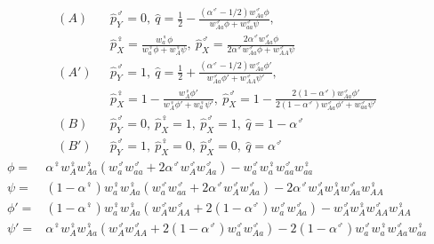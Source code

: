 \documentclass[12pt]{article}
\begin{document}
\begin{subequations}\label{eq:tightequil}
\begin{align}
(A)\ \ \ &\hat{p}_{Y}^{\male}=0,
\ \hat{q}=\frac{1}{2}-\frac{(\alpha^{\male}-1/2)w_{Aa}^{\male} \phi}{w_{Aa}^{\male} \phi+ w_{aa}^{\male} \psi},\\
&\hat{p}_{X}^{\female}=\frac{w_{a}^{\female} \phi}{w_{a}^{\female} \phi+ w_{A}^{\female} \psi},
\ \hat{p}_{X}^{\male}=\frac{2 \alpha^{\male}w_{Aa}^{\male} \phi}{2\alpha^{\male}w_{Aa}^{\male} \phi +w_{AA}^{\male} \psi} \nonumber \\
(A')\ \ \ &\hat{p}_{Y}^{\male}=1,
\ \hat{q}=\frac{1}{2}+\frac{(\alpha^{\male}-1/2)w_{Aa}^{\male} \phi'}{w_{Aa}^{\male} \phi' + w_{AA}^{\male} \psi'},\\
&\hat{p}_{X}^{\female}=1-\frac{w_{A}^{\female} \phi'}{w_{A}^{\female} \phi'+ w_{a}^{\female} \psi'},
\ \hat{p}_{X}^{\male}=1-\frac{2(1-\alpha^{\male})w_{Aa}^{\male} \phi'}{2(1-\alpha^{\male})w_{Aa}^{\male} \phi'+w_{aa}^{\male} \psi'} \nonumber \\
(B)\ \ \ &\hat{p}_{Y}^{\male}=0,\ \hat{p}_{X}^{\female}=1,\ \hat{p}_{X}^{\male}=1, \ \hat{q}=1-\alpha^{\male}\\
(B')\ \ \ &\hat{p}_{Y}^{\male}=1,\ \hat{p}_{X}^{\female}=0,\ \hat{p}_{X}^{\male}=0, \ \hat{q}=\alpha^{\male}
\end{align}
\end{subequations}
\begin{equation*}
\begin{split}
\phi=&\alpha^{\female} w_{A}^{\female} w_{Aa}^{\female}(w_{a}^{\male} w_{aa}^{\male} + 2 \alpha^{\male} w_{A}^{\male} w_{Aa}^{\male}) - w_{a}^{\male} w_{a}^{\female} w_{aa}^{\male} w_{aa}^{\female} \\
\psi=&(1-\alpha^{\female}) w_{a}^{\female} w_{Aa}^{\female}(w_{a}^{\male} w_{aa}^{\male} + 2 \alpha^{\male} w_{A}^{\male} w_{Aa}^{\male}) - 2\alpha^{\male} w_{A}^{\male} w_{A}^{\female} w_{Aa}^{\male} w_{AA}^{\female}\\
\phi'=&(1-\alpha^{\female}) w_{a}^{\female} w_{Aa}^{\female}(w_{A}^{\male} w_{AA}^{\male} + 2 (1-\alpha^{\male}) w_{a}^{\male} w_{Aa}^{\male}) - w_{A}^{\male} w_{A}^{\female} w_{AA}^{\male} w_{AA}^{\female}\\
\psi'=&\alpha^{\female} w_{A}^{\female} w_{Aa}^{\female}(w_{A}^{\male} w_{AA}^{\male} + 2 (1-\alpha^{\male}) w_{a}^{\male} w_{Aa}^{\male}) - 2(1-\alpha^{\male}) w_{a}^{\male} w_{a}^{\female} w_{Aa}^{\male} w_{aa}^{\female}
\end{split}
\end{equation*}
\end{document}
